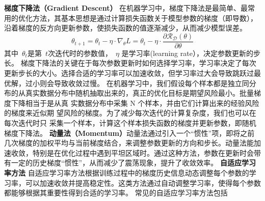  {\bf 梯度下降法（Gradient Descent）}
在机器学习中，梯度下降法是最简单、最常用的优化方法，其基本思想是通过计算损失函数关于模型参数的梯度（即导数），沿着梯度的反方向更新参数，使损失函数的值逐渐减少，从而减少模型误差。
\begin{equation}\label{eq:gd}
    \theta_{t+1} = \theta_t - \eta \cdot \nabla_\theta L =   \theta_t - \eta \cdot \frac{\partial \mathcal{R_D}(\theta)}{\partial \theta}
\end{equation}
 其中~$ \theta_t$是第~$t$次迭代时的参数值，~$\eta$ 是学习率(learning rate），决定参数更新的步长。
梯度下降法的关键在于每次参数更新时如何选择学习率，学习率决定了每次更新步长的大小。选择合适的学习率可以加速收敛，但学习率过大会导致跳跃过最优解，过小则会导致收敛过慢。
在机器学习中，我们假设每个样本都是独立同分布的从真实数据分布中随机抽取出来的，真正的优化目标是期望风险最小。批量梯度下降相当于是从真 实数据分布中采集 N 个样本，并由它们计算出来的经验风险的梯度来近似期 望风险的梯度。为了减少每次迭代的计算复杂度，我们也可以在每次迭代时只 采集一个样本，计算这个样本损失函数的梯度并更新参数，即随机梯度下降法。
{\bf 动量法（Momentum）}动量法通过引入一个“惯性”项，即将之前几次梯度的加权平均与当前梯度结合，来调整参数更新的方向和步长。动量法能加速收敛，特别是在优化过程中遇到平坦区域时。通过这种方法，参数在更新时会带有一定的历史梯度“惯性”，从而减少了震荡现象，提升了收敛效率。
{\bf 自适应学习率方法}
自适应学习率方法根据训练过程中的梯度历史信息动态调整每个参数的学习率，可以加速收敛并提高稳定性。这类方法通过自动调整学习率，使得每个参数都能够根据其重要性得到合适的学习率。
常见的自适应学习率方法包括

